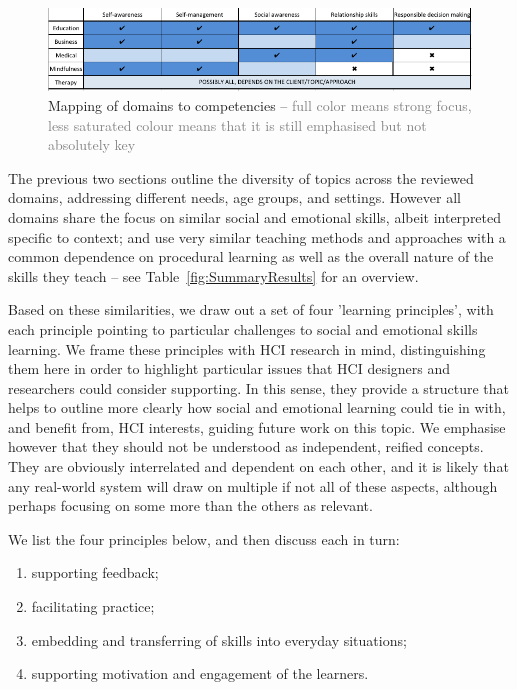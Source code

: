 \documentclass[prodmode,acmtochi]{acmsmall}
\newcommand{\todo}[1]{\textrm{\textrm{\textcolor{LightBlue}{[[#1]]}}}}
\newcommand{\rephrase}[1]{\textrm{\textrm{\textcolor{gray}{#1}}}}
\begin{document}
\begin{figure}
  \centering
        \includegraphics[width=0.9\columnwidth]{images/Table-domains}
        \caption{Mapping of domains to competencies -- \rephrase{full color means strong focus, less saturated colour means that it is still emphasised but not absolutely key}}
        \label{fig:tableLinks}
\end{figure}

\fi

The previous two sections outline the diversity of topics across the reviewed domains, addressing different needs, age groups, and settings. However all domains share the focus on similar social and emotional skills, albeit interpreted specific to context; and use very similar teaching methods and approaches with a common dependence on procedural learning as well as the overall nature of the skills they teach -- see Table~\ref{fig:SummaryResults} for an overview. 

Based on these similarities, we draw out a set of four 'learning principles', with each principle pointing to particular challenges to social and emotional skills learning. We frame these principles with HCI research in mind, distinguishing them here in order to highlight particular issues that HCI designers and researchers could consider supporting. In this sense, they provide a structure that helps to outline more clearly how social and emotional learning could tie in with, and benefit from, HCI interests, guiding future work on this topic. We emphasise however that they should not be understood as independent, reified concepts. They are obviously interrelated and dependent on each other, and it is likely that any real-world system will draw on multiple if not all of these aspects, although perhaps focusing on some more than the others as relevant.


We list the four principles below, and then discuss each in turn: 
\begin{enumerate}
        \item supporting feedback;
        \item facilitating practice;
        \item embedding and transferring of skills into everyday situations;
        \item supporting motivation and engagement of the learners.
\end{enumerate}
\end{document}
